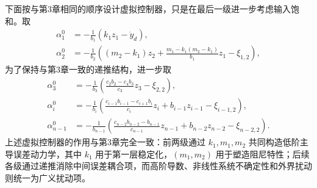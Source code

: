 下面按与第3章相同的顺序设计虚拟控制器，只是在最后一级进一步考虑输入饱和。取
\begin{subequations}
\begin{align}
\alpha_1^0 &= -\frac{1}{b_1}\left(k_1z_1-\dot y_d\right), \label{eq:ch5_alpha12}\\
\alpha_2^0 &= -\frac{1}{b_2}\left((m_2-k_1)z_2+\frac{m_1-k_1(m_2-k_1)}{b_1}z_1-\xi_{1,2}\right), \label{eq:ch5_alpha2}
\end{align}
\end{subequations}
为了保持与第3章一致的递推结构，进一步取
\begin{subequations}
\begin{align}
\alpha_3^0 &= -\frac{1}{b_3}\left(\frac{c_2b_2-c_4b_3}{c_3}z_3-\xi_{2,2}\right), \label{eq:ch5_alpha3}\\
  \alpha_i^0 &= -\frac{1}{b_i}\left(\frac{c_{i-1}b_{i-1}-c_{i+1}b_i}{c_i}z_i+b_{i-1}z_{i-1}-\xi_{i-1,2}\right), \label{eq:ch5_alphai}\\
  \alpha_{n-1}^0 &= -\frac{1}{b_{n-1}}\left(\frac{c_{n-2}b_{n-2}-b_{n-1}}{c_{n-1}}z_{n-1}+b_{n-2}z_{n-2}-\xi_{n-2,2}\right). \label{eq:ch5_alpha_nm1}
\end{align}
\end{subequations}
上述虚拟控制器的作用与第3章完全一致：前两级通过 $k_1,m_1,m_2$ 共同构造低阶主导误差动力学，其中 $k_1$ 用于第一层稳定化，$(m_1,m_2)$ 用于塑造阻尼特性；后续各级通过递推消除中间误差耦合项，而高阶导数、非线性系统不确定性和外界扰动则统一为广义扰动项。

